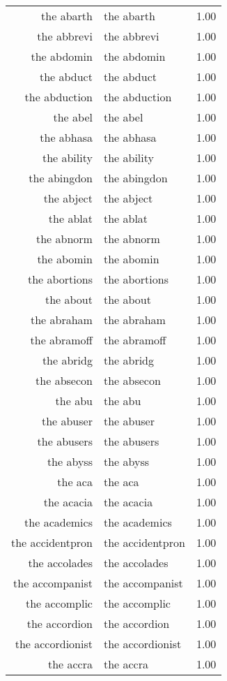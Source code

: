\begin{table}[ht]
\begin{tabular}{rlr}
  the abarth & the abarth & 1.00 \\ 
  the abbrevi & the abbrevi & 1.00 \\ 
  the abdomin & the abdomin & 1.00 \\ 
  the abduct & the abduct & 1.00 \\ 
  the abduction & the abduction & 1.00 \\ 
  the abel & the abel & 1.00 \\ 
  the abhasa & the abhasa & 1.00 \\ 
  the ability & the ability & 1.00 \\ 
  the abingdon & the abingdon & 1.00 \\ 
  the abject & the abject & 1.00 \\ 
  the ablat & the ablat & 1.00 \\ 
  the abnorm & the abnorm & 1.00 \\ 
  the abomin & the abomin & 1.00 \\ 
  the abortions & the abortions & 1.00 \\ 
  the about & the about & 1.00 \\ 
  the abraham & the abraham & 1.00 \\ 
  the abramoff & the abramoff & 1.00 \\ 
  the abridg & the abridg & 1.00 \\ 
  the absecon & the absecon & 1.00 \\ 
  the abu & the abu & 1.00 \\ 
  the abuser & the abuser & 1.00 \\ 
  the abusers & the abusers & 1.00 \\ 
  the abyss & the abyss & 1.00 \\ 
  the aca & the aca & 1.00 \\ 
  the acacia & the acacia & 1.00 \\ 
  the academics & the academics & 1.00 \\ 
  the accidentpron & the accidentpron & 1.00 \\ 
  the accolades & the accolades & 1.00 \\ 
  the accompanist & the accompanist & 1.00 \\ 
  the accomplic & the accomplic & 1.00 \\ 
  the accordion & the accordion & 1.00 \\ 
  the accordionist & the accordionist & 1.00 \\ 
  the accra & the accra & 1.00 \\ 

\end{tabular}
\end{table}
